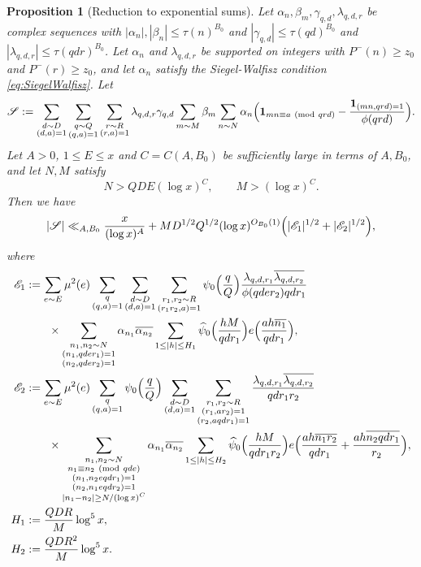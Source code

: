 \documentclass[10pt]{amsart}
\theoremstyle{plain}
\newtheorem{prpstn}[thrm]{Proposition}
\numberwithin{equation}{section}
\newcommand{\Mod}[1]{\ (\mathrm{mod}\ #1)}
\renewcommand{\hat}[1]{\widehat #1}
\begin{document}
\begin{prpstn}[Reduction to exponential sums]\label{prpstn:GeneralDispersion}
Let $\alpha_n,\beta_m,\gamma_{q,d},\lambda_{q,d,r}$ be complex sequences with $|\alpha_n|,|\beta_n|\le \tau(n)^{B_0}$ and $|\gamma_{q,d}|\le \tau(q d)^{B_0}$ and $|\lambda_{q,d,r}|\le \tau(q d r)^{B_0}$. Let $\alpha_n$ and $\lambda_{q,d,r}$ be supported on integers with $P^-(n)\ge z_0$ and $P^-(r)\ge z_0$, and let $\alpha_n$ satisfy the Siegel-Walfisz condition \eqref{eq:SiegelWalfisz}. Let
\[
\mathscr{S}:=\sum_{\substack{d\sim D\\ (d,a)=1}}\sum_{\substack{q\sim Q\\ (q,a)=1}}\sum_{\substack{r\sim R\\ (r,a)=1}}\lambda_{q,d,r}\gamma_{q,d}\sum_{m\sim M}\beta_m\sum_{n\sim N}\alpha_n\Bigl(\mathbf{1}_{m n\equiv a\Mod{q r d}}-\frac{\mathbf{1}_{(m n,q r d)=1}}{\phi(q r d)}\Bigr).
\]
Let $A>0$, $1\le E\le x$ and $C=C(A,B_0)$ be sufficiently large in terms of $A,B_0$, and let $N,M$ satisfy
\[
N>Q D E(\log{x})^{C},\qquad M>(\log{x})^C.
\]
Then we have
\[
|\mathscr{S}|\ll_{A,B_0} \frac{x}{(\log{x})^A}+M D^{1/2}Q^{1/2}(\log{x})^{O_{B_0}(1)}\Bigl(|\mathscr{E}_1|^{1/2}+|\mathscr{E}_2|^{1/2}\Bigr),
\]
where
\begin{align*}
\mathscr{E}_{1}&:=\sum_{e\sim E}\mu^2(e)\sum_{\substack{q\\ (q,a)=1}}\sum_{\substack{d\sim D\\ (d,a)=1}}\sum_{\substack{r_1,r_2\sim R\\ (r_1r_2,a)=1}}\psi_0\Bigl(\frac{q}{Q}\Bigr)\frac{\lambda_{q,d,r_1}\overline{\lambda_{q,d,r_2}} }{\phi(q d e r_2)q d r_1}\\
&\qquad \times\sum_{\substack{n_1,n_2\sim N\\ (n_1,q d e r_1)=1\\(n_2,q d e  r_2)=1}}\alpha_{n_1}\overline{\alpha_{n_2}}\sum_{1\le |h|\le H_1}\hat{\psi}_0\Bigl(\frac{h M}{q d r_1}\Bigr)e\Bigl( \frac{a h \overline{ n_1}}{q d r_1}\Bigr),\\
\mathscr{E}_2&:=\sum_{e\sim E}\mu^2(e)\sum_{\substack{q\\ (q,a)=1}}\psi_0\Bigl(\frac{q}{Q}\Bigr)\sum_{\substack{d\sim D\\ (d,a)=1}}\sum_{\substack{r_1,r_2\sim R\\ (r_1,a r_2)=1\\ (r_2,a q d r_1)=1}}\frac{\lambda_{q,d,r_1}\overline{\lambda_{q,d,r_2}}}{q d r_1 r_2}\\
&\qquad \times\sum_{\substack{n_1,n_2\sim N\\ n_1\equiv n_2\Mod{q d e}\\ (n_1,n_2 e q d r_1)=1\\(n_2,n_1 e q d r_2)=1\\ |n_1-n_2|\ge N/(\log{x})^C}}\alpha_{n_1}\overline{\alpha_{n_2}}\sum_{1\le |h|\le H_2}\hat{\psi}_0\Bigl(\frac{h M}{q d r_1 r_2}\Bigr)e\Bigl(\frac{ah\overline{n_1r_2}}{q d r_1}+\frac{ah\overline{n_2 q d r_1}}{r_2}\Bigr),\\
H_1&:=\frac{Q D R}{M}\log^5{x},\\
H_2&:=\frac{Q D R^2}{M}\log^5{x}.
\end{align*}
\end{prpstn}
\end{document}
